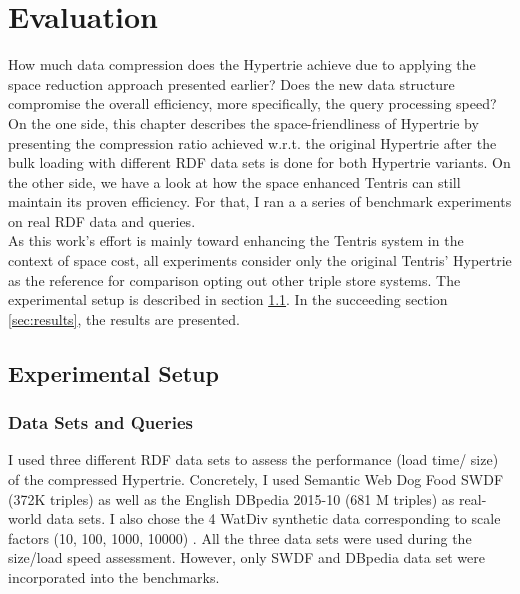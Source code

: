 \chapter{Evaluation}
\label{ch:evaluation}

How much data compression does the Hypertrie achieve due to applying the space reduction approach presented earlier? 
Does the new data structure compromise the overall efficiency, more specifically, the query processing speed? 
On the one side, this chapter describes the space-friendliness of Hypertrie by presenting the compression ratio achieved w.r.t. the original Hypertrie after the bulk loading with different RDF data sets is done for both Hypertrie variants.  
On the other side, we have a look at how the space enhanced Tentris can still maintain its proven efficiency. For that, I ran a a series of benchmark experiments on real RDF data and queries. \\

As this work's effort is mainly toward enhancing the Tentris system in the context of space cost, all experiments consider only the original Tentris' Hypertrie as the reference for comparison opting out other triple store systems. The experimental setup is described in section \ref{sec:exper_setup}. In the succeeding section \ref{sec:results}, the results are presented.

\section{Experimental Setup}
\label{sec:exper_setup}

\subsection{Data Sets and Queries}
\label{subsec:datasets}

 I used three different RDF data sets to assess the performance  (load time/ size) of the compressed Hypertrie. Concretely, I used Semantic Web Dog Food SWDF (372K triples) as well as the English DBpedia 2015-10 (681 M triples) as real-world data sets. 
I also chose the 4 WatDiv synthetic data corresponding to scale factors (10, 100, 1000, 10000) \cite{WatDiv}. All the three data sets were used during the size/load speed assessment. However, only SWDF and DBpedia data set were incorporated into the benchmarks.

